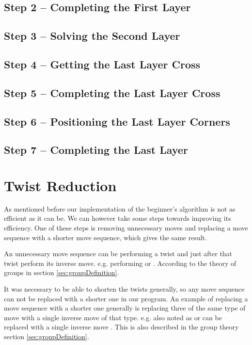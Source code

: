 \subsection{Step 2 -- Completing the First Layer}

\subsection{Step 3 -- Solving the Second Layer}

\subsection{Step 4 --  Getting the Last Layer Cross}

\subsection{Step 5 -- Completing the Last Layer Cross}

\subsection{Step 6 -- Positioning the Last Layer Corners}

\subsection{Step 7 -- Completing the Last Layer}


\section{Twist Reduction}
As mentioned before our implementation of the beginner's algorithm is not as efficient as it can be. We can however take some steps towards improving its efficiency. One of these steps is removing unnecessary moves and replacing a move sequence with a shorter move sequence, which gives the same result.

An unnecessary move sequence can be performing a twist and just after that twist perform its inverse move. e.g. performing  or .
According to the theory of groups in section \ref{sec:groupDefinition}.

It was necessary to be able to shorten the twists generally, so any move sequence can not be replaced with a shorter one in our program.
An example of replacing a move sequence with a shorter one generally is replacing three of the same type of move with a single inverse move of that type. e.g.  also noted as  or  can be replaced with a single inverse move . This is also described in the group theory section \ref{sec:groupDefinition}.



